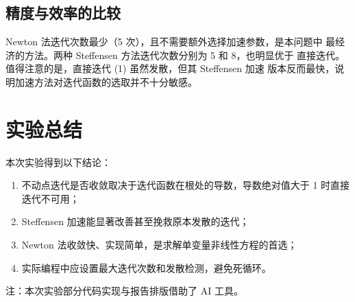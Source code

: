 \documentclass[UTF8]{ctexart}
\begin{document}
\subsection{精度与效率的比较}

Newton 法迭代次数最少（5 次），且不需要额外选择加速参数，是本问题中
最经济的方法。两种 Steffensen 方法迭代次数分别为 5 和 8，也明显优于
直接迭代。值得注意的是，直接迭代 (1) 虽然发散，但其 Steffensen 加速
版本反而最快，说明加速方法对迭代函数的选取并不十分敏感。

\section{实验总结}

本次实验得到以下结论：

\begin{enumerate}
  \item 不动点迭代是否收敛取决于迭代函数在根处的导数，导数绝对值大于 1
        时直接迭代不可用；
  \item Steffensen 加速能显著改善甚至挽救原本发散的迭代；
  \item Newton 法收敛快、实现简单，是求解单变量非线性方程的首选；
  \item 实际编程中应设置最大迭代次数和发散检测，避免死循环。
\end{enumerate}

注：本次实验部分代码实现与报告排版借助了 AI 工具。
\end{document}
